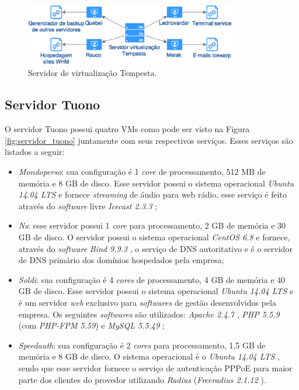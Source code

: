 \begin{figure}[h!]
 \centering
 \includegraphics[width=350px]{img/servidor_tempesta.eps}
 \caption{Servidor de virtualização Tempesta.}
 \label{fig:servidor_tempesta}
\end{figure}

\subsection{Servidor Tuono}
\label{section:serv_tuono}

O servidor Tuono possui quatro \ac{VM}s como pode ser visto na Figura \ref{fig:servidor_tuono} juntamente com seus respectivos serviços. 
Esses serviços são listados a seguir:
\begin{itemize}
 \item \textit{Mondoperso}: sua configuração é 1 \textit{core} de processamento, 512 MB de memória e 8 GB de disco. Esse servidor possui o 
 sistema operacional \textit{Ubuntu 14.04 \ac{LTS}} \cite{ubuntu} e fornece \textit{streaming} de áudio para web rádio, esse serviço é feito
 através do \textit{software} livre \textit{Icecast 2.3.3} \cite{icecast};
 
 \item \textit{Ns}: esse servidor possui 1 \textit{core} para processamento, 2 GB de memória e 30 GB de disco. O servidor possui o sistema 
 operacional \textit{CentOS 6.8} \cite{centos} e fornece, através do \textit{software} \textit{Bind 9.9.3} \cite{bind}, o serviço de \ac{DNS} 
 autoritativo e é o servidor de \ac{DNS} primário dos domínios hospedados pela empresa;

 \item \textit{Soldi}: sua configuração é 4 \textit{cores} de processamento, 4 GB de memória e 40 GB de disco. Esse servidor possui o 
 sistema operacional \textit{Ubuntu 14.04 \ac{LTS}} \cite{ubuntu} e é um servidor \textit{web} exclusivo para \textit{softwares} de gestão 
 desenvolvidos pela empresa. Os seguintes \textit{softwares} são utilizados: \textit{Apache 2.4.7} \cite{apache}, \textit{\ac{PHP} 5.5.9} \cite{php} 
 (com \textit{PHP-FPM 5.59}) e \textit{MySQL 5.5.49} \cite{mysql};

 \item \textit{Speedauth}: sua configuração é 2 \textit{cores} para processamento, 1,5 GB de memória e 8 GB de disco. O sistema operacional é o 
 \textit{Ubuntu 14.04 \ac{LTS}} \cite{ubuntu}, sendo que esse servidor fornece o serviço de autenticação \ac{PPPoE} para maior parte dos clientes 
 do provedor utilizando \textit{Radius} (\textit{Freeradius 2.1.12} \cite{freeradius}).
\end{itemize}

